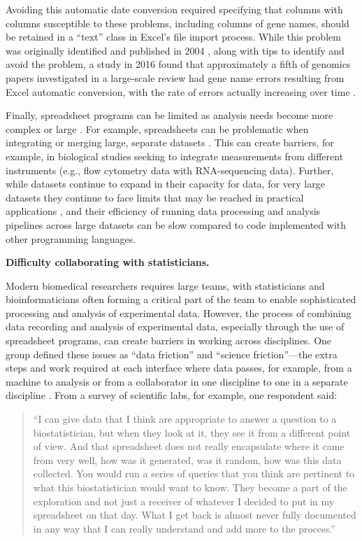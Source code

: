 \documentclass[]{tufte-book}
\begin{document}
Avoiding this automatic date conversion required specifying that columns with
columns susceptible to these problems, including columns of gene names, should
be retained in a ``text'' class in Excel's file import process. While this
problem was originally identified and published in 2004 \citep{zeeberg2004mistaken},
along with tips to identify and avoid the problem, a study in 2016 found that
approximately a fifth of genomics papers investigated in a large-scale review
had gene name errors resulting from Excel automatic conversion, with the rate of
errors actually increasing over time \citep{ziemann2016gene}.

Finally, spreadsheet programs can be limited as analysis needs become more
complex or large \citep{topaloglou2004biological}. For example, spreadsheets can be
problematic when integrating or merging large, separate datasets
\citep{birch2018future}. This can create barriers, for example, in biological studies
seeking to integrate measurements from different instruments (e.g., flow
cytometry data with RNA-sequencing data). Further, while datasets continue to
expand in their capacity for data, for very large datasets they continue to face
limits that may be reached in practical applications \citep{birch2018future}, and
their efficiency of running data processing and analysis pipelines across large
datasets can be slow compared to code implemented with other programming
languages.

\textbf{Difficulty collaborating with statisticians.}

Modern biomedical researchers requires large teams, with statisticians and
bioinformaticians often forming a critical part of the team to enable
sophisticated processing and analysis of experimental data. However, the process
of combining data recording and analysis of experimental data, especially
through the use of spreadsheet programs, can create barriers in working across
disciplines. One group defined these issues as ``data friction'' and ``science
friction''---the extra steps and work required at each interface where data
passes, for example, from a machine to analysis or from a collaborator in one
discipline to one in a separate discipline \citep{edwards2011science}.
From a survey of scientific labs, for example, one respondent said:

\begin{quote}
``I can give data that I think are appropriate to answer a question to a
biostatistician, but when they look at it, they see it from a different point of
view. And that spreadsheet does not really encapsulate where it came from very
well, how was it generated, was it random, how was this data collected. You
would run a series of queries that you think are pertinent to what this
biostatistician would want to know. They become a part of the exploration and
not just a receiver of whatever I decided to put in my spreadsheet on that day.
What I get back is almost never fully documented in any way that I can really
understand and add more to the process.'' \citep{myneni2010organization}
\end{quote}
\end{document}
